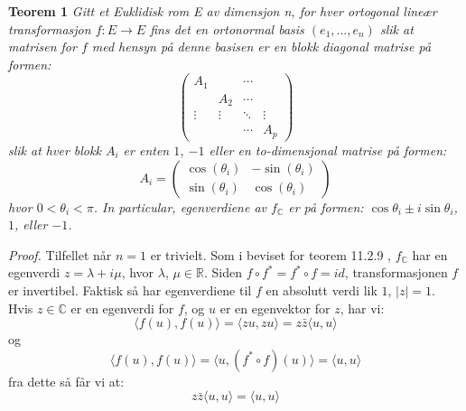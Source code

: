 \documentclass[a4paper,10pt,english]{article}
\begin{document}
    \textbf{Teorem 1} \textit{Gitt et Euklidisk rom E av dimensjon n, for hver ortogonal lineær transformasjon $f \colon E \rightarrow E$ fins det en ortonormal basis $\left( e_{1}, \dots, e_{n} \right)$
                              slik at matrisen for $f$ med hensyn på denne basisen er en blokk diagonal matrise på formen: 
                              $$
                              \begin{pmatrix}
                                A_{1}  &        & \cdots &        \\
                                       & A_{2}  & \cdots &        \\
                                \vdots & \vdots & \ddots & \vdots \\
                                       &        & \cdots & A_{p}
                              \end{pmatrix}
                              $$
                              slik at hver blokk $A_{i}$ er enten $1$, $-1$ eller en to-dimensjonal matrise på formen:
                              $$ A_{i} = 
                              \begin{pmatrix}
                                \cos(\theta_{i}) & -\sin(\theta_{i}) \\
                                \sin(\theta_{i}) &  \cos(\theta_{i})
                              \end{pmatrix}
                              $$
                              hvor $0 < \theta_{i} < \pi$. In particular, egenverdiene av $f_{\mathbb{C}}$ er på formen: $\cos\theta_{i} \pm i\sin\theta_{i}$, $1$, eller $-1$.} \cite{GMA}

    \textit{Proof.} Tilfellet når $n = 1$ er trivielt. Som i beviset for teorem 11.2.9 \cite{GMA}, $f_{\mathbb{C}}$ har en egenverdi $z = \lambda+i\mu$, hvor $\lambda$, $\mu \in \mathbb{R}$.
                    Siden $f \circ f^{*} = f^{*} \circ f = id$, transformasjonen $f$ er invertibel. Faktisk så har egenverdiene til $f$ en absolutt verdi lik $1$, $\lvert z \rvert = 1$.
                    Hvis $z \in \mathbb{C}$ er en egenverdi for $f$, og $u$ er en egenvektor for $z$, har vi:
                    $$
                    \langle f(u), f(u) \rangle = \langle zu, zu \rangle = z \bar{z} \langle u, u \rangle
                    $$
                    og
                    $$
                    \langle f(u), f(u) \rangle = \langle u, (f^{*} \circ f)(u) \rangle = \langle u, u \rangle
                    $$
                    fra dette så får vi at:
                    $$
                    z \bar{z} \langle u, u \rangle = \langle u, u \rangle
                    $$
\end{document}
